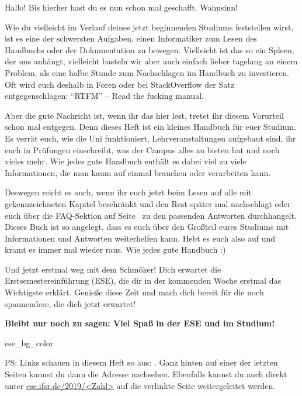 

Hallo! Bis hierher hast du es nun schon mal geschafft. Wahnsinn!

Wie du vielleicht im Verlauf deines jetzt beginnenden Studiums feststellen wirst, ist es eine der schwersten Aufgaben, einen Informatiker zum Lesen des Handbuchs oder der Dokumentation zu bewegen. Vielleicht ist das so ein Spleen, der uns anhängt, vielleicht basteln wir aber auch einfach lieber tagelang an einem Problem, als eine halbe Stunde zum Nachschlagen im Handbuch zu investieren.
Oft wird euch deshalb in Foren oder bei StackOverflow der Satz entgegenschlagen: \enquote{RTFM} -- Read the fucking manual.

Aber die gute Nachricht ist, wenn ihr das hier lest, tretet ihr diesem Vorurteil schon mal entgegen. Denn dieses Heft ist ein kleines Handbuch für euer Studium.
Es verrät euch, wie die Uni funktioniert, Lehrveranstaltungen aufgebaut sind, ihr euch in Prüfungen einschreibt, was der Campus alles zu bieten hat und noch vieles mehr.
Wie jedes gute Handbuch enthält es dabei viel zu viele Informationen, die man kaum auf einmal brauchen oder verarbeiten kann.

Deswegen reicht es auch, wenn ihr euch jetzt beim Lesen auf alle mit  gekennzeichneten Kapitel beschränkt und den Rest später mal nachschlagt oder euch über die FAQ-Sektion auf Seite~\pageref{sec:faq} zu den passenden Antworten durchhangelt.
Dieses Buch ist so angelegt, dass es euch über den Großteil eures Studiums mit Informationen und Antworten weiterhelfen kann. Hebt es euch also auf und kramt es immer mal wieder raus. Wie jedes gute Handbuch :)

Und jetzt erstmal weg mit dem Schmöker! Dich erwartet die Erstsemestereinführung (ESE), die dir in der kommenden Woche erstmal das Wichtigste erklärt.
Genieße diese Zeit und mach dich bereit für die noch spannendere, die dich jetzt erwartet!

\textbf{Bleibt nur noch zu sagen: Viel Spaß in der ESE und im Studium!}


\bigskip
\begin{awesomeblock}{2pt}{\faLightbulb[regular]}{ese_bg_color}
    \begin{minipage}[t]{.82\textwidth}
\small PS\@: Links schauen in diesem Heft so aus: . Ganz hinten auf einer der letzten Seiten kannst du dann die Adresse nachsehen. Ebenfalls kannst du auch direkt unter \url{ese.ifsr.de/2019/<Zahl>} auf die verlinkte Seite weitergeleitet werden.
    \end{minipage}
\end{awesomeblock}
